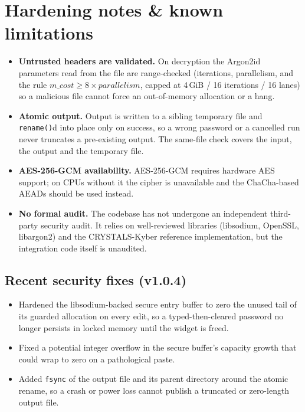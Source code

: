 \documentclass[11pt,a4paper]{article}
\newcommand{\code}[1]{\texttt{#1}}
\begin{document}
\section{Hardening notes \& known limitations}

\begin{itemize}[leftmargin=1.4em]
  \item \textbf{Untrusted headers are validated.} On decryption the Argon2id
        parameters read from the file are range-checked (iterations,
        parallelism, and the rule $m\_cost \ge 8 \times parallelism$, capped
        at 4\,GiB / 16 iterations / 16 lanes) so a malicious file cannot force
        an out-of-memory allocation or a hang.
  \item \textbf{Atomic output.} Output is written to a sibling temporary file
        and \code{rename()}d into place only on success, so a wrong password
        or a cancelled run never truncates a pre-existing output. The
        same-file check covers the input, the output and the temporary file.
  \item \textbf{AES-256-GCM availability.} AES-256-GCM requires hardware AES
        support; on CPUs without it the cipher is unavailable and the
        ChaCha-based AEADs should be used instead.
  \item \textbf{No formal audit.} The codebase has not undergone an
        independent third-party security audit. It relies on well-reviewed
        libraries (libsodium, OpenSSL, libargon2) and the CRYSTALS-Kyber
        reference implementation, but the integration code itself is
        unaudited.
\end{itemize}

\subsection*{Recent security fixes (v1.0.4)}
\begin{itemize}[leftmargin=1.4em]
  \item Hardened the libsodium-backed secure entry buffer to zero the unused
        tail of its guarded allocation on every edit, so a typed-then-cleared
        password no longer persists in locked memory until the widget is freed.
  \item Fixed a potential integer overflow in the secure buffer's capacity
        growth that could wrap to zero on a pathological paste.
  \item Added \texttt{fsync} of the output file and its parent directory around
        the atomic rename, so a crash or power loss cannot publish a truncated
        or zero-length output file.
\end{itemize}
\end{document}
